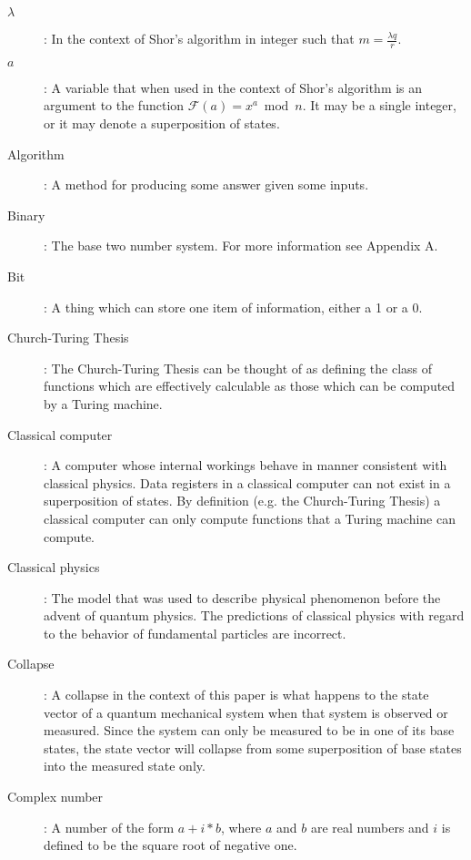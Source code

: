 \documentclass[]{article}
\begin{document}
\begin{description}

\item[$\lambda$]:
	In the context of Shor's algorithm in integer such that $m =
\frac{\lambda q}{r}$.

\item[$a$]:
	A variable that when used in the context of Shor's algorithm
is an argument to the function $\mathcal{F}(a) = x^{a} \bmod n$. It may
be a single integer, or it may denote a superposition of states.

\item[Algorithm]: 
	A method for producing some answer given some inputs.

\item[Binary]:
	The base two number system.  For more information see Appendix
A.

\item[Bit]: 
	A thing which can store one item of information, either a 1 or
a 0.

\item[Church-Turing Thesis]:
	The Church-Turing Thesis can be thought of as defining the
        class of functions which are effectively calculable as those
        which can be computed by a Turing machine.
 
\item[Classical computer]: 
        A computer whose internal workings behave in manner consistent
        with classical physics.  Data registers in a classical
        computer can not exist in a superposition of states.  By
        definition (e.g. the Church-Turing Thesis) a classical
        computer can only compute functions that a Turing machine can
        compute.

\item[Classical physics]:
	The model that was used to describe physical phenomenon before
the advent of quantum physics.  The predictions of classical physics
with regard to the behavior of fundamental particles are incorrect.

\item[Collapse]:
	A collapse in the context of this paper is what happens to the
state vector of a quantum mechanical system when that system is
observed or measured.  Since the system can only be measured to be in
one of its base states, the state vector will collapse from some
superposition of base states into the measured state only.

\item[Complex number]:
	A number of the form $a + i * b$, where $a$ and $b$ are real
numbers and $i$ is defined to be the square root of negative one.


\end{description}
\end{document}
